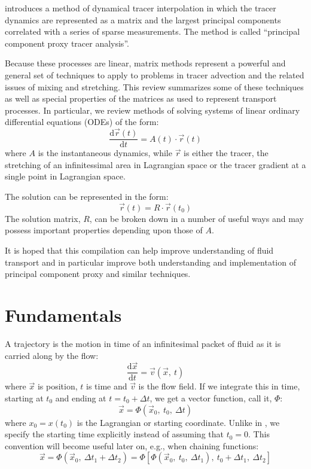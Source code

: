 \documentclass[11pt]{article}
\begin{document}
\citet{Mills2012} introduces a method of dynamical tracer interpolation
in which the tracer dynamics are represented as a matrix and the largest
principal components correlated with a series of sparse measurements.
The method is called ``principal component proxy tracer analysis''.

Because these processes are linear, matrix methods represent a powerful and
general set of techniques to apply to problems in tracer advection and the
related issues of mixing and stretching.
This review summarizes some of these techniques as well as special properties
of the matrices as used to represent transport processes.  In particular, 
we review methods of solving systems of linear ordinary differential
equations (ODEs) of the form:
\begin{equation}
\frac{\mathrm d \vec r(t)}{\mathrm d t} = A(t) \cdot \vec r(t)
\end{equation}
where $A$ is the instantaneous dynamics, while $\vec r$ is either the tracer,
the stretching of an infinitessimal area in Lagrangian space or the tracer gradient at a single point
in Lagrangian space. 

The solution can be represented in the form:
\begin{equation}
\vec r(t)=R \cdot \vec r(t_0)
\end{equation}
The solution matrix, $R$, can be broken down in a number of useful ways
and may possess important properties depending upon those of $A$.  

It is hoped that this compilation
can help improve understanding of fluid transport and in particular 
improve both understanding and implementation of principal component
proxy and similar techniques.

\section{Fundamentals}

A trajectory is the motion in time of an infinitesimal packet of fluid
as it is carried along by the flow:
\begin{equation}
	\frac{\mathrm d \vec x}{\mathrm d t}=\vec v(\vec x,~t) \label{trajectory_equation}
\end{equation}
where $\vec x$ is position, $t$ is time and $\vec v$ is the flow field.
If we integrate this in time, starting at $t_0$ and ending at $t=t_0+\Delta t$, we get a
vector function, call it, $\Phi$:
\begin{equation}
	\vec x=\Phi(\vec x_0,~t_0,~\Delta t)
\label{traj_def}
\end{equation}
where $x_0=x(t_0)$ is the Lagrangian or starting coordinate.
Unlike in \citet{Ottino1989}, we specify the starting time explicitly instead 
of assuming that $t_0=0$.  This convention will become useful later on, e.g., 
when chaining functions:
\begin{equation}
\vec x=\Phi(\vec x_0,~\Delta t_1+\Delta t_2)=\Phi[\Phi(\vec x_0,~t_0,~\Delta t_1),~t_0 + \Delta t_1,~\Delta t_2]
\label{traj_fun_chaining}
\end{equation}
\end{document}
